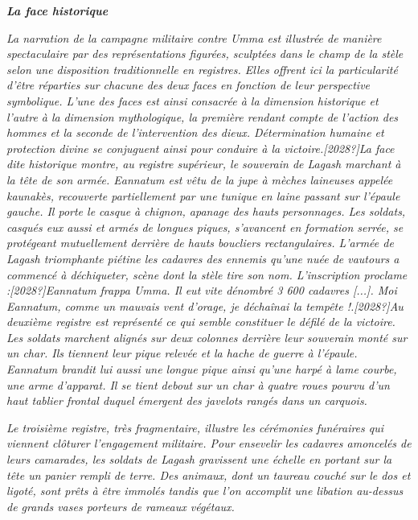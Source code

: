 \documentclass[a4paper]{article}
\begin{document}
\textbf{\textit{La face {\textquotedbl}historique{\textquotedbl}}}

\textit{La narration de la campagne militaire contre Umma est illustrée de manière spectaculaire par des représentations
figurées, sculptées dans le champ de la stèle selon une disposition traditionnelle en registres. Elles offrent ici la
particularité d'être réparties sur chacune des deux faces en fonction de leur perspective symbolique. L'une des faces
est ainsi consacrée à la dimension {\textquotedbl}historique{\textquotedbl} et l'autre à la} \textit{dimension
{\textquotedbl}mythologique{\textquotedbl}, la première rendant compte de l'action des hommes et la seconde de
l'intervention des dieux. Détermination humaine et protection divine se conjuguent ainsi pour conduire à la
victoire.[2028?]La face dite {\textquotedbl}historique{\textquotedbl} montre, au registre supérieur, le souverain de
Lagash marchant à la tête de son armée. Eannatum est vêtu de la jupe à mèches laineuses appelée kaunakès, recouverte
partiellement par une tunique en laine passant sur l'épaule gauche. Il porte le casque à chignon, apanage des hauts
personnages. Les soldats, casqués eux aussi et armés de longues piques, s'avancent en formation serrée, se protégeant
mutuellement derrière de hauts boucliers rectangulaires. L'armée de Lagash triomphante piétine les cadavres des ennemis
qu'une nuée de vautours a commencé à déchiqueter, scène dont la stèle tire son nom. L'inscription proclame
:[2028?]{\textquotedbl}}\textit{Eannatum }\textit{frappa Umma. Il eut vite dénombré 3 600 cadavres [...]. Moi Eannatum,
comme un mauvais vent d'orage, je déchaînai la tempête !}\textit{{\textquotedbl}.[2028?]Au deuxième registre est
représenté ce qui semble constituer le défilé de la victoire. Les soldats marchent alignés sur deux colonnes derrière
leur souverain monté sur un char. Ils tiennent leur pique relevée et la hache de guerre à l'épaule. Eannatum brandit
lui aussi une longue pique ainsi qu'une harpé à lame courbe, une arme d'apparat. Il se tient debout sur un char à
quatre roues pourvu d'un haut tablier frontal duquel émergent des javelots rangés dans un carquois.}

\textit{Le troisième registre, très fragmentaire, illustre les cérémonies funéraires qui viennent clôturer l'engagement
militaire. Pour ensevelir les cadavres amoncelés de leurs camarades, les soldats de Lagash gravissent une échelle en
portant sur la tête un panier rempli de terre. Des animaux, dont un taureau couché sur le dos et ligoté, sont prêts à
être immolés tandis que l'on accomplit une libation au-dessus de grands vases porteurs de rameaux végétaux.}
\end{document}
